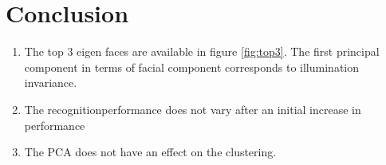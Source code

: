 \documentclass[conference]{IEEEtran}
\begin{document}




\section{Conclusion}

\begin{enumerate}

\item The top 3 eigen faces are available in figure \ref{fig:top3}. The first principal component in terms of facial component corresponds to illumination invariance.
\item The recognitionperformance does not vary after an initial increase in performance
\item The PCA does not have an effect on the clustering. 
\end{enumerate}










\end{document}
